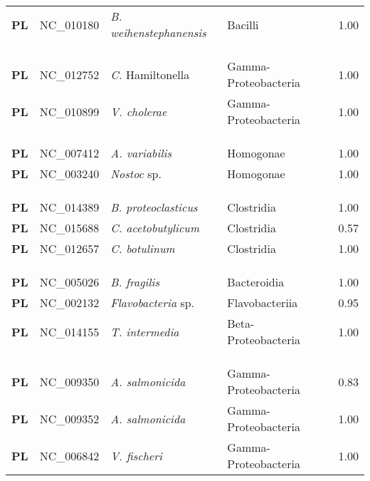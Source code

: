 \begin{adjustwidth}{-3cm}{2cm}
{\begin{supertabular}{>{\bfseries}l|p{0.1\textwidth}p{0.14\textwidth}l|l}
PL & NC\_010180 & \textit{B. weihenstephanensis} & Bacilli & 1.00\\
\\
\\
\hline\\
PL & NC\_012752 & \textit{C.} Hamiltonella & Gamma-Proteobacteria & 1.00\\
PL & NC\_010899 & \textit{V. cholerae} & Gamma-Proteobacteria & 1.00\\
\\
\\
\hline\\
PL & NC\_007412 & \textit{A. variabilis} & Homogonae & 1.00\\
PL & NC\_003240 & \textit{Nostoc} sp. & Homogonae & 1.00\\
\\
\\
\hline\\
PL & NC\_014389 & \textit{B. proteoclasticus} & Clostridia & 1.00\\
PL & NC\_015688 & \textit{C. acetobutylicum} & Clostridia & 0.57\\
PL & NC\_012657 & \textit{C. botulinum} & Clostridia & 1.00\\
\\
\\
\hline\\
PL & NC\_005026 & \textit{B. fragilis} & Bacteroidia & 1.00\\
PL & NC\_002132 & \textit{Flavobacteria} sp. & Flavobacteriia & 0.95\\
PL & NC\_014155 & \textit{T. intermedia} & Beta-Proteobacteria & 1.00\\
\\
\\
\hline\\
PL & NC\_009350 & \textit{A. salmonicida} & Gamma-Proteobacteria & 0.83\\
PL & NC\_009352 & \textit{A. salmonicida} & Gamma-Proteobacteria & 1.00\\
PL & NC\_006842 & \textit{V. fischeri} & Gamma-Proteobacteria & 1.00\\

\end{supertabular}}
\end{adjustwidth}
